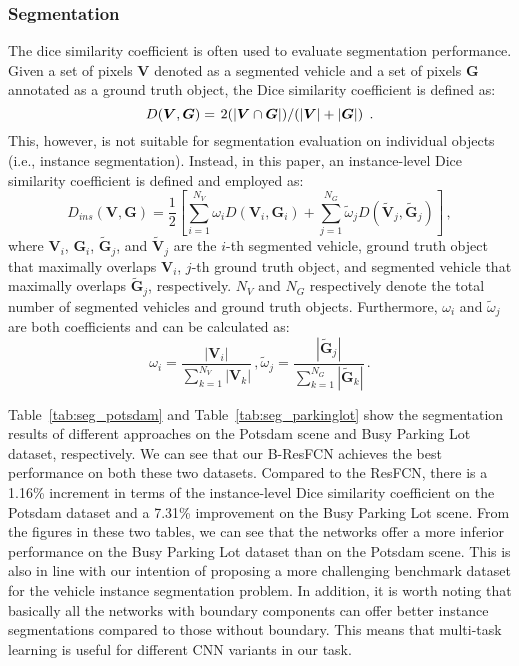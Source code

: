 \documentclass[journal]{IEEEtran}
\newcommand{\RR}[2]{\textcolor[rgb]{0,0,0}
{#2}}
\begin{document}
\subsubsection{\textbf{Segmentation}}
The dice similarity coefficient is often used to evaluate segmentation performance. Given a set of pixels $\bm{V}$ denoted as a segmented vehicle and a set of pixels $\bm{G}$ annotated as a ground truth object, the Dice similarity coefficient is defined as:
\begin{equation}\label{eq:dsc}
D(\bm{V},\bm{G})=\left. 2(|\bm{V}\cap\bm{G}|) \middle / (|\bm{V}|+|\bm{G}|) \right.\,.
\end{equation}
This, however, is not suitable for segmentation evaluation on individual objects (i.e., instance segmentation). Instead, in this paper, an instance-level Dice similarity coefficient is defined and employed as:
\begin{equation}\label{eq:ins_dsc}
D_{ins}(\bm{V},\bm{G})=\frac{1}{2}[\sum_{i=1}^{N_{V}}\omega_iD(\bm{V}_i,\bm{G}_i)+\sum_{j=1}^{N_{G}}\tilde{\omega}_jD(\tilde{\bm{V}}_j,\tilde{\bm{G}}_j)]\,,
\end{equation}
where $\bm{V}_i$, $\bm{G}_i$, $\tilde{\bm{G}}_j$, and $\tilde{\bm{V}}_j$ are the $i$-th segmented vehicle, ground truth object that maximally overlaps $\bm{V}_i$, $j$-th ground truth object, and segmented vehicle that maximally overlaps $\tilde{\bm{G}}_j$, respectively. $N_{V}$ and $N_{G}$ respectively denote the total number of segmented vehicles and ground truth objects. Furthermore, $\omega_i$ and $\tilde{\omega}_j$ are both coefficients and can be calculated as:
\begin{equation}\label{eq:ins_dsc_weight}
\omega_i=\frac{|\bm{V}_i|}{\sum_{k=1}^{N_V}|\bm{V}_k|}\,,
\tilde{\omega}_j=\frac{|\tilde{\bm{G}}_j|}{\sum_{k=1}^{N_G}|\tilde{\bm{G}}_k|}\,.
\end{equation}
\par
Table~\ref{tab:seg_potsdam} and Table~\ref{tab:seg_parkinglot} show the segmentation results of different approaches on the Potsdam scene and Busy Parking Lot dataset, respectively. We can see that our B-ResFCN achieves the best performance on both these two datasets. Compared to the ResFCN, there is a 1.16\% increment in terms of the instance-level Dice similarity coefficient on the Potsdam dataset and a 7.31\% improvement on the Busy Parking Lot scene. From the figures in these two tables, we can see that the networks offer a more inferior performance on the Busy Parking Lot dataset than on the Potsdam scene. This is also in line with our intention of proposing a more challenging benchmark dataset for the vehicle instance segmentation problem. In addition, it is \RR{}{worth noting} that basically all the networks with boundary components can offer better instance segmentations compared to those without boundary. This means that multi-task learning is useful for different CNN variants in our task.
\end{document}
